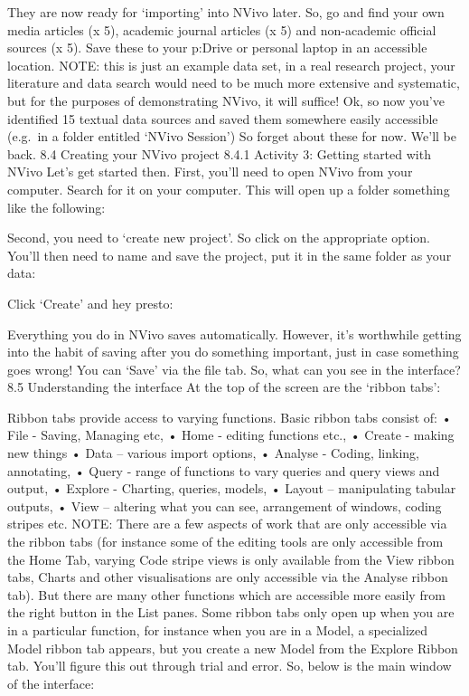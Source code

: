 \documentclass[
]{book}
\begin{document}
They are now ready for `importing' into NVivo later.
So, go and find your own media articles (x 5), academic journal articles (x 5) and non-academic official sources (x 5). Save these to your p:Drive or personal laptop in an accessible location.
NOTE: this is just an example data set, in a real research project, your literature and data search would need to be much more extensive and systematic, but for the purposes of demonstrating NVivo, it will suffice!
Ok, so now you've identified 15 textual data sources and saved them somewhere easily accessible (e.g.~in a folder entitled `NVivo Session')
So forget about these for now. We'll be back.
8.4 Creating your NVivo project
8.4.1 Activity 3: Getting started with NVivo
Let's get started then. First, you'll need to open NVivo from your computer. Search for it on your computer. This will open up a folder something like the following:

Second, you need to `create new project'. So click on the appropriate option. You'll then need to name and save the project, put it in the same folder as your data:

Click `Create' and hey presto:

Everything you do in NVivo saves automatically. However, it's worthwhile getting into the habit of saving after you do something important, just in case something goes wrong! You can `Save' via the file tab.
So, what can you see in the interface?
8.5 Understanding the interface
At the top of the screen are the `ribbon tabs':

Ribbon tabs provide access to varying functions.
Basic ribbon tabs consist of:
• File - Saving, Managing etc,
• Home - editing functions etc.,
• Create - making new things
• Data -- various import options,
• Analyse - Coding, linking, annotating,
• Query - range of functions to vary queries and query views and output,
• Explore - Charting, queries, models,
• Layout -- manipulating tabular outputs,
• View -- altering what you can see, arrangement of windows, coding stripes etc.
NOTE: There are a few aspects of work that are only accessible via the ribbon tabs (for instance some of the editing tools are only accessible from the Home Tab, varying Code stripe views is only available from the View ribbon tabs, Charts and other visualisations are only accessible via the Analyse ribbon tab). But there are many other functions which are accessible more easily from the right button in the List panes. Some ribbon tabs only open up when you are in a particular function, for instance when you are in a Model, a specialized Model ribbon tab appears, but you create a new Model from the Explore Ribbon tab. You'll figure this out through trial and error.
So, below is the main window of the interface:
\end{document}
